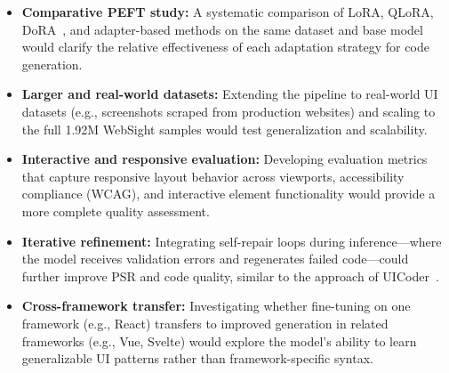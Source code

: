 \begin{itemize}
    \item \textbf{Comparative PEFT study:} A systematic comparison of LoRA, QLoRA, DoRA~\cite{liu2024dora}, and adapter-based methods on the same dataset and base model would clarify the relative effectiveness of each adaptation strategy for code generation.
    
    \item \textbf{Larger and real-world datasets:} Extending the pipeline to real-world UI datasets (e.g., screenshots scraped from production websites) and scaling to the full 1.92M WebSight samples would test generalization and scalability.
    
    \item \textbf{Interactive and responsive evaluation:} Developing evaluation metrics that capture responsive layout behavior across viewports, accessibility compliance (WCAG), and interactive element functionality would provide a more complete quality assessment.
    
    \item \textbf{Iterative refinement:} Integrating self-repair loops during inference—where the model receives validation errors and regenerates failed code—could further improve PSR and code quality, similar to the approach of UICoder~\cite{feng2023uicoder}.
    
    \item \textbf{Cross-framework transfer:} Investigating whether fine-tuning on one framework (e.g., React) transfers to improved generation in related frameworks (e.g., Vue, Svelte) would explore the model's ability to learn generalizable UI patterns rather than framework-specific syntax.
\end{itemize}



